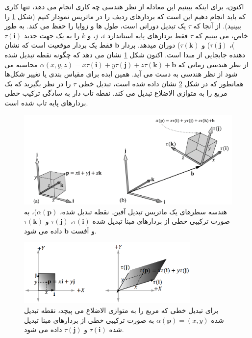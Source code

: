 {\begin{spacing}{1.5}
        اکنون، برای اینکه ببینیم این معادله از نظر هندسی چه کاری انجام می دهد، تنها کاری که باید انجام دهیم این است که بردارهای ردیف را در ماتریس نمودار کنیم (شکل \ref{fig:4.Session.1.3.7} را ببینید).
        از آنجا که $\tau$ یک تبدیل دورانی است، طول ها و زوایا را حفظ می کند.
        به طور خاص، می بینیم که $\tau$ فقط بردارهای پایه استاندارد $i$، $j$، و $k$ را به یک جهت جدید $\tau(\textbf{i})$)، $\tau(\textbf{j})$) و $\tau(\textbf{k})$) دوران میدهد.
        بردار $\textbf{b}$ فقط یک بردار موقعیت است که نشان دهنده جابجایی از مبدا است.
        اکنون شکل \ref{fig:4.Session.1.3.7} نشان می دهد که چگونه نقطه تبدیل شده از نظر هندسی زمانی که $\alpha(x,y,z)=x\tau(\textbf{i})+y\tau(\textbf{j})+z\tau(\textbf{k})+\textbf{b}$ محاسبه می شود از نظر هندسی به دست می آید.
        همین ایده برای مقیاس بندی یا تغییر شکل‌ها همانطور که در شکل \ref{fig:4.Session.1.3.8} نشان داده شده است،
        تبدیل خطی $\tau$ را در نظر بگیرید که یک مربع را به متوازی الاضلاع تبدیل می کند.
        نقطه تاب دار به سادگی ترکیب خطی بردارهای پایه تاب شده است.

        \begin{figure}[H]
            \centering
            \setlength{\belowcaptionskip}{-10pt}
            \includegraphics[width=\textwidth]{Images/4/3/4.Session.1.3.7}
            \caption {هندسه سطرهای یک ماتریس تبدیل آفین. نقطه تبدیل شده، $\alpha(\textbf{p})$)، به صورت ترکیبی خطی از بردارهای مبنا تبدیل شده $\tau(\textbf{i})$، $\tau(\textbf{j})$ و $\tau(\textbf{k})$ و آفست $\textbf{b}$ داده می شود.}
            \label{fig:4.Session.1.3.7}
        \end{figure}

        \begin{figure}[H]
            \centering
            \setlength{\belowcaptionskip}{-10pt}
            \includegraphics[width=0.8\textwidth]{Images/4/3/4.Session.1.3.8}
            \caption {برای تبدیل خطی که مربع را به متوازی الاضلاع می پیچد، نقطه تبدیل شده $\alpha(\textbf{p})=(x,y)$ به صورت ترکیبی خطی از بردارهای مبنا تبدیل شده $\tau(\textbf{i})$ و $\tau(\textbf{j})$ داده می شود.}
            \label{fig:4.Session.1.3.8}
        \end{figure}
    \end{spacing}
}


